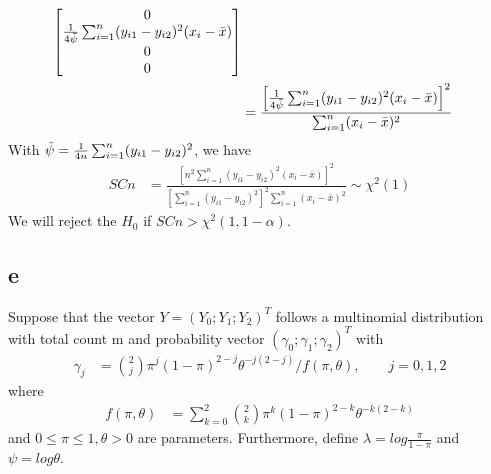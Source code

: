 \documentclass[11pt]{article} %
\begin{document}
\begin{itemize}
\begin{align*}
\begin{bmatrix}
			0\\
			\frac{1}{4 \Tilde{\psi}} \sum_{i=1}^n(y_{i1}-y_{i2})^2 (x_i-\bar{x})   \\
			0 \\
			0 \\
		\end{bmatrix} \\
		&= \frac{\left[ \frac{1}{4 \Tilde{\psi}} \sum_{i=1}^n(y_{i1}-y_{i2})^2 (x_i-\bar{x}) \right]^2}{\sum_{i=1}^n (x_i-\bar{x})^2}
	\end{align*} 
	With $\Tilde{\psi} = \frac{1}{4n} \sum_{i=1}^n (y_{i1}- y_{i2})^2$, we have
	\begin{align*}
		SCn &= \frac{\left[n^2 \sum_{i=1}^n(y_{i1}-y_{i2})^2 (x_i-\bar{x}) \right]^2}{[\sum_{i=1}^n (y_{i1}- y_{i2})^2]^2 \sum_{i=1}^n (x_i-\bar{x})^2} \sim \chi^2(1)
	\end{align*} 
	We will reject the $H_0$ if $SCn > \chi^2(1, 1-\alpha)$.
\end{itemize}



\subsection{e}
Suppose that the vector $Y = (Y_0; Y_1; Y_2)^T$ follows a multinomial distribution with total count m and probability vector $(\gamma_0; \gamma_1; \gamma_2)^T$ with
\begin{align*}
	\gamma_j &= {2 \choose j} \pi^j (1-\pi)^{2-j} \theta^{-j(2-j)} /f(\pi, \theta), \qquad j= 0,1,2
\end{align*} 
where
\begin{align*}
	f(\pi, \theta) &= \sum_{k=0}^2 {2 \choose k} \pi^k (1-\pi)^{2-k} \theta^{-k(2-k)}
\end{align*} 
and $0 \leq \pi \leq 1, \theta >0$ are parameters. Furthermore, define $\lambda = log \frac{\pi}{1-\pi}$ and $\psi = log \theta$.
\end{document}
